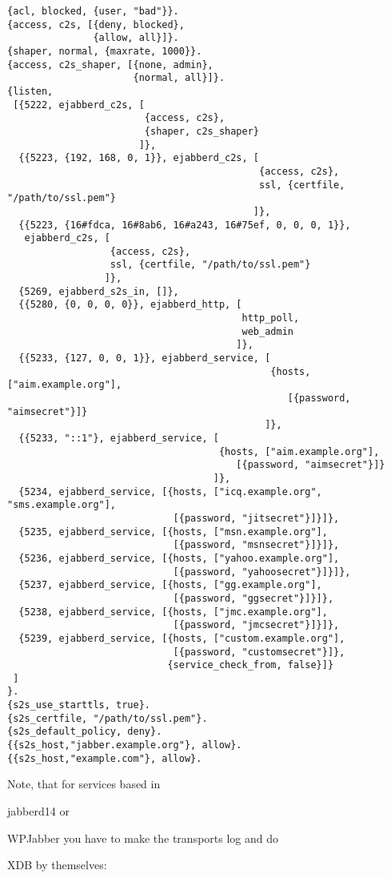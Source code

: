 \documentclass[a4paper,10pt]{book}
\newcommand{\ind}[1]{\begin{latexonly}\index{#1}\end{latexonly}}
\begin{document}
\begin{verbatim}
{acl, blocked, {user, "bad"}}.
{access, c2s, [{deny, blocked},
               {allow, all}]}.
{shaper, normal, {maxrate, 1000}}.
{access, c2s_shaper, [{none, admin},
                      {normal, all}]}.
{listen,
 [{5222, ejabberd_c2s, [
                        {access, c2s},
                        {shaper, c2s_shaper}
                       ]},
  {{5223, {192, 168, 0, 1}}, ejabberd_c2s, [
                                            {access, c2s},
                                            ssl, {certfile, "/path/to/ssl.pem"}
                                           ]},
  {{5223, {16#fdca, 16#8ab6, 16#a243, 16#75ef, 0, 0, 0, 1}},
   ejabberd_c2s, [
                  {access, c2s},
                  ssl, {certfile, "/path/to/ssl.pem"}
                 ]},
  {5269, ejabberd_s2s_in, []},
  {{5280, {0, 0, 0, 0}}, ejabberd_http, [
                                         http_poll,
                                         web_admin
                                        ]},
  {{5233, {127, 0, 0, 1}}, ejabberd_service, [
                                              {hosts, ["aim.example.org"],
                                                 [{password, "aimsecret"}]}
                                             ]},
  {{5233, "::1"}, ejabberd_service, [
                                     {hosts, ["aim.example.org"],
                                        [{password, "aimsecret"}]}
                                    ]},
  {5234, ejabberd_service, [{hosts, ["icq.example.org", "sms.example.org"],
                             [{password, "jitsecret"}]}]},
  {5235, ejabberd_service, [{hosts, ["msn.example.org"],
                             [{password, "msnsecret"}]}]},
  {5236, ejabberd_service, [{hosts, ["yahoo.example.org"],
                             [{password, "yahoosecret"}]}]},
  {5237, ejabberd_service, [{hosts, ["gg.example.org"],
                             [{password, "ggsecret"}]}]},
  {5238, ejabberd_service, [{hosts, ["jmc.example.org"],
                             [{password, "jmcsecret"}]}]},
  {5239, ejabberd_service, [{hosts, ["custom.example.org"],
                             [{password, "customsecret"}]},
                            {service_check_from, false}]}
 ]
}.
{s2s_use_starttls, true}.
{s2s_certfile, "/path/to/ssl.pem"}.
{s2s_default_policy, deny}.
{{s2s_host,"jabber.example.org"}, allow}.
{{s2s_host,"example.com"}, allow}.
\end{verbatim}
Note, that for services based in \ind{jabberd14}jabberd14 or \ind{WPJabber}WPJabber
you have to make the transports log and do \ind{XDB}XDB by themselves:
\end{document}
